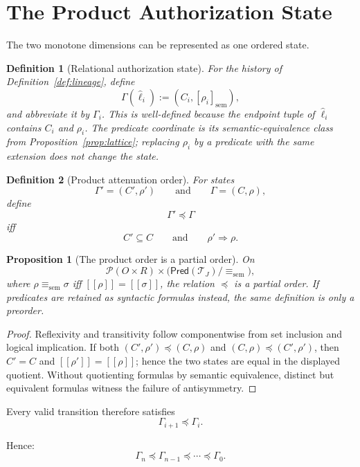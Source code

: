 \documentclass[10pt,twocolumn]{article}
\newcommand{\sem}[1]{\left[\!\left[#1\right]\!\right]}
\newcommand{\Transitions}{\mathcal{T}}
\newcommand{\Pred}{\mathsf{Pred}}
\newtheorem{definition}{Definition}
\newtheorem{proposition}{Proposition}
\begin{document}
\section{The Product Authorization State}

The two monotone dimensions can be represented as one ordered state.

\begin{definition}[Relational authorization state]
For the history of Definition~\ref{def:lineage}, define
\[
\Gamma(\widehat{\ell}_i)
:=
(C_i,[\rho_i]_{\mathrm{sem}}),
\]
and abbreviate it by \(\Gamma_i\). This is well-defined because the endpoint
tuple of \(\widehat{\ell}_i\) contains \(C_i\) and \(\rho_i\). The predicate
coordinate is its semantic-equivalence class from
Proposition~\ref{prop:lattice}; replacing \(\rho_i\) by a predicate with the
same extension does not change the state.
\end{definition}

\begin{definition}[Product attenuation order]
For states
\[
\Gamma'=(C',\rho')
\qquad\text{and}\qquad
\Gamma=(C,\rho),
\]
define
\[
\Gamma'\preceq\Gamma
\]
iff
\[
C'\subseteq C
\qquad\text{and}\qquad
\rho'\Rightarrow\rho.
\]
\end{definition}

\begin{proposition}[The product order is a partial order]
On
\[
\mathcal P(O\times R)\times
\big(\Pred(\Transitions_J)/{\equiv_{\mathrm{sem}}}\big),
\]
where \(\rho\equiv_{\mathrm{sem}}\sigma\) iff
\(\sem{\rho}=\sem{\sigma}\), the relation \(\preceq\) is a partial order. If
predicates are retained as syntactic formulas instead, the same definition is
only a preorder.
\end{proposition}

\begin{proof}
Reflexivity and transitivity follow componentwise from set inclusion and
logical implication. If both \((C',\rho')\preceq(C,\rho)\) and
\((C,\rho)\preceq(C',\rho')\), then \(C'=C\) and
\(\sem{\rho'}=\sem{\rho}\); hence the two states are equal in the displayed
quotient. Without quotienting formulas by semantic equivalence, distinct but
equivalent formulas witness the failure of antisymmetry.
\end{proof}

Every valid transition therefore satisfies
\[
\Gamma_{i+1}\preceq\Gamma_i.
\]

Hence:
\[
\Gamma_n
\preceq
\Gamma_{n-1}
\preceq
\cdots
\preceq
\Gamma_0.
\]
\end{document}
